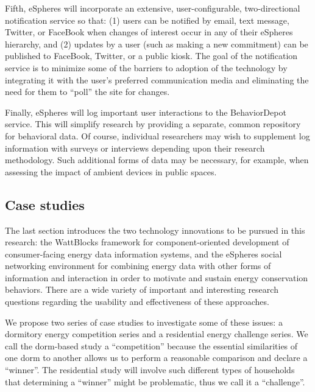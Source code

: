 Fifth, eSpheres will incorporate an extensive, user-configurable,
two-directional notification service so that: (1) users can be notified by
email, text message, Twitter, or FaceBook when changes of interest occur in
any of their eSpheres hierarchy, and (2) updates by a user (such as making
a new commitment) can be published to FaceBook, Twitter, or a public
kiosk. The goal of the notification service is to minimize some of the
barriers to adoption of the technology by integrating it with the user's
preferred communication media and eliminating the need for them to ``poll''
the site for changes.  

Finally, eSpheres will log important user interactions to the BehaviorDepot
service.  This will simplify research by providing a separate, common
repository for behavioral data.  Of course, individual researchers may wish
to supplement log information with surveys or interviews depending upon
their research methodology.  Such additional forms of data may be
necessary, for example, when assessing the impact of ambient devices in
public spaces.

\subsection{Case studies}

The last section introduces the two technology innovations to be pursued in
this research: the WattBlocks framework for component-oriented development
of consumer-facing energy data information systems, and the eSpheres social
networking environment for combining energy data with other forms of
information and interaction in order to motivate and sustain energy
conservation behaviors.  There are a wide variety of important and
interesting research questions regarding the usability and effectiveness of
these approaches.  

We propose two series of case studies to investigate some of these issues:
a dormitory energy competition series and a residential energy challenge
series.  We call the dorm-based study a ``competition'' because the
essential similarities of one dorm to another allows us to perform a
reasonable comparison and declare a ``winner''.  The residential study will
involve such different types of households that determining a ``winner''
might be problematic, thus we call it a ``challenge''.  

